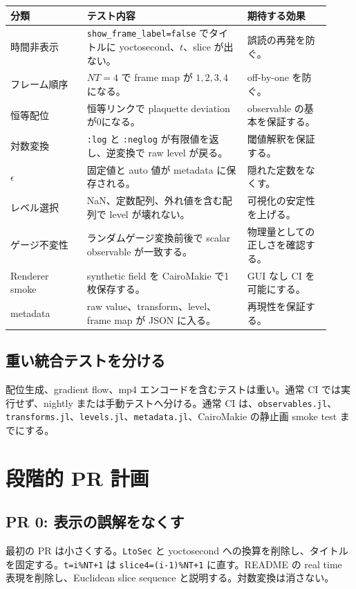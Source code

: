 \documentclass[uplatex,dvipdfmx,ja=standard,11pt,a4paper]{bxjsarticle}
\newcommand{\code}[1]{\texttt{#1}}
\begin{document}
\begin{longtable}{p{0.22\linewidth}p{0.46\linewidth}p{0.24\linewidth}}
\toprule
分類 & テスト内容 & 期待する効果 \\
\midrule
時間非表示 & \code{show\_frame\_label=false} でタイトルに yoctosecond、\(t\)、slice が出ない。 & 誤読の再発を防ぐ。 \\
フレーム順序 & \(NT=4\) で frame map が \(1,2,3,4\) になる。 & off-by-one を防ぐ。 \\
恒等配位 & 恒等リンクで plaquette deviation が0になる。 & observable の基本を保証する。 \\
対数変換 & \code{:log} と \code{:neglog} が有限値を返し、逆変換で raw level が戻る。 & 閾値解釈を保証する。 \\
\(\epsilon\) & 固定値と auto 値が metadata に保存される。 & 隠れた定数をなくす。 \\
レベル選択 & NaN、定数配列、外れ値を含む配列で level が壊れない。 & 可視化の安定性を上げる。 \\
ゲージ不変性 & ランダムゲージ変換前後で scalar observable が一致する。 & 物理量としての正しさを確認する。 \\
Renderer smoke & synthetic field を CairoMakie で1枚保存する。 & GUI なし CI を可能にする。 \\
metadata & raw value、transform、level、frame map が JSON に入る。 & 再現性を保証する。 \\
\bottomrule
\end{longtable}

\subsection{重い統合テストを分ける}
配位生成、gradient flow、mp4 エンコードを含むテストは重い。通常 CI では実行せず、nightly または手動テストへ分ける。通常 CI は、\code{observables.jl}、\code{transforms.jl}、\code{levels.jl}、\code{metadata.jl}、CairoMakie の静止画 smoke test までにする。

\section{段階的 PR 計画}
\subsection{PR 0: 表示の誤解をなくす}
最初の PR は小さくする。\code{LtoSec} と yoctosecond への換算を削除し、タイトルを固定する。\code{t=i\%NT+1} は \code{slice4=(i-1)\%NT+1} に直す。README の real time 表現を削除し、Euclidean slice sequence と説明する。対数変換は消さない。
\end{document}
